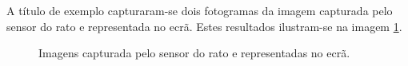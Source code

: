 \documentclass[a4paper,11pt]{article}
\begin{document}
A título de exemplo capturaram-se dois fotogramas da imagem capturada pelo sensor do rato e representada no ecrã. Estes resultados ilustram-se na imagem \ref{samples}.

\begin{figure}
	\begin{subfigmatrix}{2}
	\end{subfigmatrix}
	\caption{Imagens capturada pelo sensor do rato e representadas no ecrã.}
	\label{samples}
\end{figure}
\end{document}
